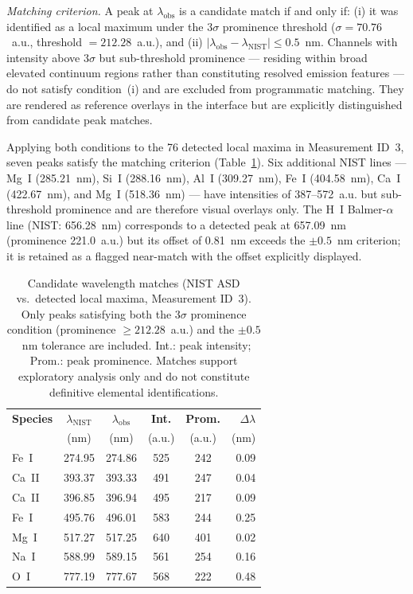 \documentclass[final,5p,twocolumn,a4paper]{elsarticle}
\begin{document}
\textit{Matching criterion.} A peak at $\lambda_{\mathrm{obs}}$ is a candidate match if and only if: (i) it was identified as a local maximum under the $3\sigma$ prominence threshold ($\sigma = 70.76$~a.u., threshold $= 212.28$~a.u.), and (ii) $|\lambda_{\mathrm{obs}} - \lambda_{\mathrm{NIST}}| \leq 0.5$~nm. Channels with intensity above $3\sigma$ but sub-threshold prominence --- residing within broad elevated continuum regions rather than constituting resolved emission features --- do not satisfy condition~(i) and are excluded from programmatic matching. They are rendered as reference overlays in the interface but are explicitly distinguished from candidate peak matches.

Applying both conditions to the 76 detected local maxima in Measurement ID~3, seven peaks satisfy the matching criterion (Table~\ref{table:elements}). Six additional NIST lines --- Mg~I (285.21~nm), Si~I (288.16~nm), Al~I (309.27~nm), Fe~I (404.58~nm), Ca~I (422.67~nm), and Mg~I (518.36~nm) --- have intensities of 387--572~a.u. but sub-threshold prominence and are therefore visual overlays only. The H~I Balmer-$\alpha$ line (NIST: 656.28~nm) corresponds to a detected peak at 657.09~nm (prominence 221.0~a.u.) but its offset of 0.81~nm exceeds the $\pm0.5$~nm criterion; it is retained as a flagged near-match with the offset explicitly displayed.

\begin{table}[!htbp]
\centering
\footnotesize
\setlength{\tabcolsep}{3pt}
\begin{tabular}{@{}p{1.0cm}ccccr@{}}
\toprule
\textbf{Species} & \textbf{$\lambda_{\mathrm{NIST}}$} & \textbf{$\lambda_{\mathrm{obs}}$} & \textbf{Int.} & \textbf{Prom.} & \textbf{$\Delta\lambda$} \\
 & (nm) & (nm) & (a.u.) & (a.u.) & (nm) \\
\midrule
Fe~I  & 274.95 & 274.86 & 525 & 242 & 0.09 \\
Ca~II & 393.37 & 393.33 & 491 & 247 & 0.04 \\
Ca~II & 396.85 & 396.94 & 495 & 217 & 0.09 \\
Fe~I  & 495.76 & 496.01 & 583 & 244 & 0.25 \\
Mg~I  & 517.27 & 517.25 & 640 & 401 & 0.02 \\
Na~I  & 588.99 & 589.15 & 561 & 254 & 0.16 \\
O~I   & 777.19 & 777.67 & 568 & 222 & 0.48 \\
\bottomrule
\end{tabular}
\caption{Candidate wavelength matches (NIST ASD vs.\ detected local maxima, Measurement ID~3). Only peaks satisfying both the $3\sigma$ prominence condition (prominence $\geq 212.28$~a.u.) and the $\pm0.5$~nm tolerance are included. Int.: peak intensity; Prom.: peak prominence. Matches support exploratory analysis only and do not constitute definitive elemental identifications.}
\label{table:elements}
\end{table}
\end{document}
